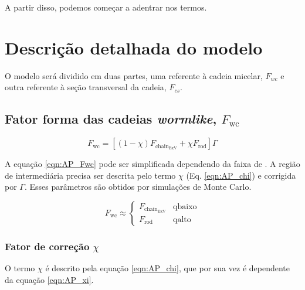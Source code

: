 \begin{apendicesenv}
A partir disso, podemos começar a adentrar nos termos.

\section{Descrição detalhada do modelo}

O modelo será dividido em duas partes, uma referente à cadeia micelar, \(F_{wc}\) e outra referente à seção transversal da cadeia, \(F_{cs}\).

\subsection{Fator forma das cadeias \emph{wormlike}, \(F_{\mathrm{wc}}\)}
\label{sec:equacoes_Fwc}

\begin{equation}
F_{\mathrm{wc}} = \left[\left(1 - \chi\right)F_{\mathrm{chain}_{\mathrm{ExV}}} + \chi F_{\mathrm{rod}}\right]\Gamma
\label{eqn:AP_Fwc}
\end{equation}

A equação \ref{eqn:AP_Fwc} pode ser simplificada dependendo da faixa de \q. A região de \q intermediária precisa ser descrita pelo termo \(\chi\) (Eq. \ref{eqn:AP_chi}) e corrigida por \(\Gamma\). Esses parâmetros são obtidos por simulações de Monte Carlo.

\begin{equation}
	F_\mathrm{wc} \approx 
		\begin{cases}
			F_{\mathrm{chain}_\mathrm{ExV}}		& \mathrm{q baixo}  \\
			F_\mathrm{rod}						& \mathrm{q alto}
		\end{cases}
	\label{eqn:AP_Fwc_dois_casos}
\end{equation}


\subsubsection{Fator de correção \(\chi\)}
O termo \(\chi\) é descrito pela equação \ref{eqn:AP_chi}, que por sua vez é dependente da equação \ref{eqn:AP_xi}.


\end{apendicesenv}
